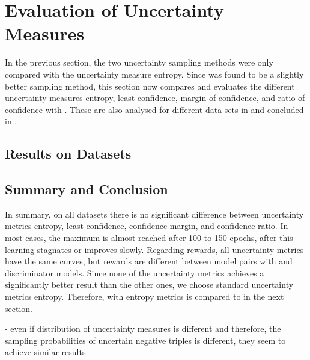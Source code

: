\section{Evaluation of Uncertainty Measures}
\label{ch:evaluation:sec:evaluation_metrics}
%
In the previous section, the two uncertainty sampling methods were only compared with the uncertainty measure entropy.
Since \ussoftmax was found to be a slightly better sampling method, this section now compares and evaluates the different uncertainty measures entropy, least confidence, margin of confidence, and ratio of confidence with \ussoftmax. 
These are also analysed for different data sets in  and concluded in .
%
\subsection{Results on Datasets} \label{subsec:measures_results}














\subsection{Summary and Conclusion}
\label{subsec:measure_conclusion}
In summary, on all datasets there is no significant difference between uncertainty metrics entropy, least confidence, confidence margin, and confidence ratio.
In most cases, the maximum is almost reached after 100 to 150 epochs, after this learning stagnates or improves slowly.
Regarding rewards, all uncertainty metrics have the same curves, but rewards are different between model pairs with \transe and \transe discriminator models.
Since none of the uncertainty metrics achieves a significantly better result than the other ones, we choose standard uncertainty metrics entropy.
Therefore, \ussoftmax with entropy metrics is compared to \origsampling in the next section.


- even if distribution of uncertainty measures is different and therefore, the sampling probabilities of uncertain negative triples is different, they seem to achieve similar results
- 